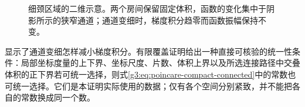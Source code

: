 \begin{figure}[htbp]
	\centering
	
	\caption{细颈区域的二维示意。两个房间保留固定体积，函数的变化集中于阴影所示的狭窄通道；通道变细时，梯度积分趋零而函数振幅保持不变。}
	\label{g3:fig:poincare-neck}
\end{figure}

显示了通道变细怎样减小梯度积分。有限覆盖证明给出一种直接可核验的统一性条件：局部坐标度量的上下界、坐标尺度、片数、体积上界以及所选连接路径中交叠体积的正下界若可统一选择，则式\eqref{g3:eq:poincare-compact-connected}中的常数也可统一选择。它们是本证明实际使用的数据；仅有各个空间分别紧致，并不能把各自的常数换成同一个数。
